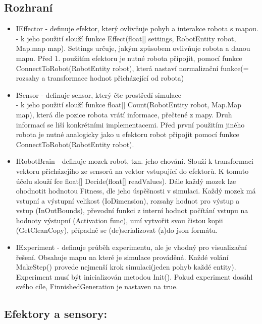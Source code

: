 \documentclass[12pt, oneside]{article}
\begin{document}
\subsection{Rozhraní}
\begin{itemize}
	\item IEffector
	- definuje efektor, který ovlivňuje pohyb a interakce robota s mapou. \\
	- k jeho použití slouží funkce Effect(float[] settings, RobotEntity robot, Map.map map). Settings určuje, jakým způsobem ovlivňuje robota a danou mapu. Před 1. použitím efektoru je nutné robota připojit, pomocí funkce ConnectToRobot(RobotEntity robot), která nastaví normalizační funkce(= rozsahy a transformace hodnot přicházející od robota) 
	\item ISensor 
	- definuje sensor, který čte prostředí simulace \\
	- k jeho použití slouží funkce float[] Count(RobotEntity robot, Map.Map map), která dle pozice robota vrátí informace, přečtené z mapy. Druh informací se liší konkrétními implementacemi. Před první použitím jiného robota je nutné analogicky jako u efektoru robot připojit pomocí funkce ConnectToRobot(RobotEntity robot).
	\item IRobotBrain - definuje mozek robot, tzn. jeho chování. Slouží k transformaci vektoru přicházejího ze sensorů na vektor vstupující do efektorů. K tomuto účelu slouží fce float[] Decide(float[] readValues). Dále každý mozek lze ohodnotit hodnotou Fitness, dle jeho úspěšnosti v simulaci. Každý mozek má vstupní a výstupní velikost (IoDimension),  rozsahy hodnot pro výstup a vstup (InOutBounds), převodní funkci z interní hodnot počítání vstupu na hodnoty výstupní (Activation func), umí vytvořit svou čistou kopii (GetCleanCopy), případně se (de)serializovat (z)do json formátu. 
	\item IExperiment - definuje průběh experimentu, ale je vhodný pro visualizační řešení. Obsahuje mapu na které je simulace prováděná. Každé volání MakeStep() provede nejmenší krok simulaci(jeden pohyb každé entity). Experiment musí být inicializován metodou Init(). Pokud experiment dosáhl svého cíle, FinnishedGeneration je nastaven na true. 
\end{itemize}
\newpage
\subsection{Efektory a sensory:} 
\end{document}

